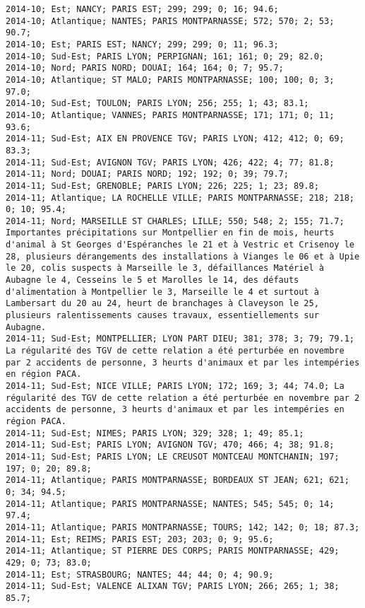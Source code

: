 \documentclass{article}
\begin{document}
\begin{Verbatim}[commandchars=\\\{\}]
2014-10; Est; NANCY; PARIS EST; 299; 299; 0; 16; 94.6; 
2014-10; Atlantique; NANTES; PARIS MONTPARNASSE; 572; 570; 2; 53; 90.7; 
2014-10; Est; PARIS EST; NANCY; 299; 299; 0; 11; 96.3; 
2014-10; Sud-Est; PARIS LYON; PERPIGNAN; 161; 161; 0; 29; 82.0; 
2014-10; Nord; PARIS NORD; DOUAI; 164; 164; 0; 7; 95.7; 
2014-10; Atlantique; ST MALO; PARIS MONTPARNASSE; 100; 100; 0; 3; 97.0; 
2014-10; Sud-Est; TOULON; PARIS LYON; 256; 255; 1; 43; 83.1; 
2014-10; Atlantique; VANNES; PARIS MONTPARNASSE; 171; 171; 0; 11; 93.6; 
2014-11; Sud-Est; AIX EN PROVENCE TGV; PARIS LYON; 412; 412; 0; 69; 83.3; 
2014-11; Sud-Est; AVIGNON TGV; PARIS LYON; 426; 422; 4; 77; 81.8; 
2014-11; Nord; DOUAI; PARIS NORD; 192; 192; 0; 39; 79.7; 
2014-11; Sud-Est; GRENOBLE; PARIS LYON; 226; 225; 1; 23; 89.8; 
2014-11; Atlantique; LA ROCHELLE VILLE; PARIS MONTPARNASSE; 218; 218; 0; 10; 95.4; 
2014-11; Nord; MARSEILLE ST CHARLES; LILLE; 550; 548; 2; 155; 71.7; Importantes précipitations sur Montpellier en fin de mois, heurts d'animal à St Georges d'Espéranches le 21 et à Vestric et Crisenoy le 28, plusieurs dérangements des installations à Vianges le 06 et à Upie le 20, colis suspects à Marseille le 3, défaillances Matériel à Aubagne le 4, Cesseins le 5 et Marolles le 14, des défauts d'alimentation à Montpellier le 3, Marseille le 4 et surtout à Lambersart du 20 au 24, heurt de branchages à Claveyson le 25, plusieurs ralentissements causes travaux, essentiellements sur Aubagne.
2014-11; Sud-Est; MONTPELLIER; LYON PART DIEU; 381; 378; 3; 79; 79.1; La régularité des TGV de cette relation a été perturbée en novembre par 2 accidents de personne, 3 heurts d'animaux et par les intempéries en région PACA.
2014-11; Sud-Est; NICE VILLE; PARIS LYON; 172; 169; 3; 44; 74.0; La régularité des TGV de cette relation a été perturbée en novembre par 2 accidents de personne, 3 heurts d'animaux et par les intempéries en région PACA.
2014-11; Sud-Est; NIMES; PARIS LYON; 329; 328; 1; 49; 85.1; 
2014-11; Sud-Est; PARIS LYON; AVIGNON TGV; 470; 466; 4; 38; 91.8; 
2014-11; Sud-Est; PARIS LYON; LE CREUSOT MONTCEAU MONTCHANIN; 197; 197; 0; 20; 89.8; 
2014-11; Atlantique; PARIS MONTPARNASSE; BORDEAUX ST JEAN; 621; 621; 0; 34; 94.5; 
2014-11; Atlantique; PARIS MONTPARNASSE; NANTES; 545; 545; 0; 14; 97.4; 
2014-11; Atlantique; PARIS MONTPARNASSE; TOURS; 142; 142; 0; 18; 87.3; 
2014-11; Est; REIMS; PARIS EST; 203; 203; 0; 9; 95.6; 
2014-11; Atlantique; ST PIERRE DES CORPS; PARIS MONTPARNASSE; 429; 429; 0; 73; 83.0; 
2014-11; Est; STRASBOURG; NANTES; 44; 44; 0; 4; 90.9; 
2014-11; Sud-Est; VALENCE ALIXAN TGV; PARIS LYON; 266; 265; 1; 38; 85.7; 

\end{Verbatim}
\end{document}
